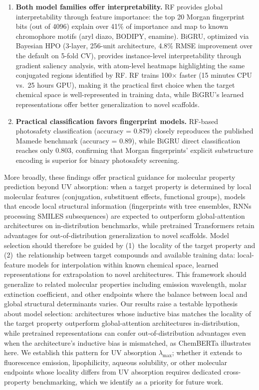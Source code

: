 \documentclass[journal=jcisd8,manuscript=article]{achemso}
\newcommand{\added}[1]{{\color{addedblue}#1}}
\newcommand{\removed}[1]{{\color{removedred}#1}}
\begin{document}
\begin{enumerate}
 \item \textbf{Both model families offer interpretability.}
 RF provides global interpretability through feature importance: the top 20 Morgan fingerprint bits (out of 4096) explain over 41\% of importance and map to known chromophore motifs (aryl diazo, BODIPY, enamine).
 BiGRU, optimized via Bayesian HPO (3-layer, 256-unit architecture, 4.8\% RMSE improvement over the default on 5-fold CV), provides instance-level interpretability through gradient saliency analysis, with atom-level heatmaps highlighting the same conjugated regions identified by RF.
 RF trains 100$\times$ faster (15 minutes CPU vs.\ 25 hours GPU), making it the practical first choice when the target chemical space is well-represented in training data, while BiGRU's learned representations offer better generalization to novel scaffolds.

 \item \textbf{Practical classification favors fingerprint models.}
 RF-based photosafety classification (accuracy = 0.879) closely reproduces the published Mamede benchmark (accuracy = 0.89), while BiGRU direct classification reaches only 0.803, confirming that Morgan fingerprints' explicit substructure encoding is superior for binary photosafety screening.
\end{enumerate}

\removed{More broadly, these findings offer practical guidance for molecular property prediction beyond UV absorption: when a target property is determined by local molecular features (conjugation, substituent effects, functional groups), models that encode local structural information (fingerprints with tree ensembles, RNNs processing SMILES subsequences) are expected to outperform global-attention architectures on in-distribution benchmarks, while pretrained Transformers retain advantages for out-of-distribution generalization to novel scaffolds.}
\removed{Model selection should therefore be guided by (1)~the locality of the target property and (2)~the relationship between target compounds and available training data: local-feature models for interpolation within known chemical space, learned representations for extrapolation to novel architectures.}
\removed{This framework should generalize to related molecular properties including emission wavelength, molar extinction coefficient, and other endpoints where the balance between local and global structural determinants varies.}
\added{Our results raise a testable hypothesis about model selection: architectures whose inductive bias matches the locality of the target property outperform global-attention architectures in-distribution, while pretrained representations can confer out-of-distribution advantages even when the architecture's inductive bias is mismatched, as ChemBERTa illustrates here. We establish this pattern for UV absorption $\lambda_{\max}$; whether it extends to fluorescence emission, lipophilicity, aqueous solubility, or other molecular endpoints whose locality differs from UV absorption requires dedicated cross-property benchmarking, which we identify as a priority for future work.}
\end{document}
